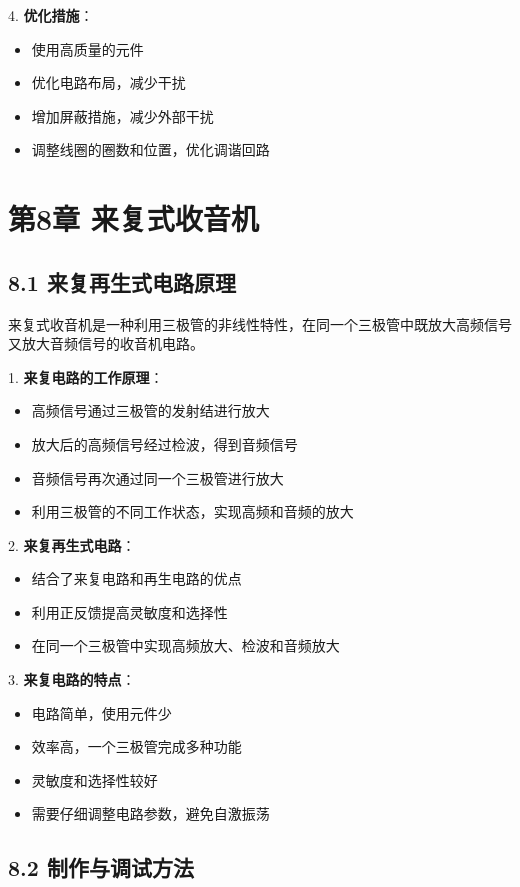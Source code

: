 \documentclass[12pt,UTF8]{ctexbook}
\begin{document}
4. \textbf{优化措施}：
   \begin{itemize}[leftmargin=3.5em]
   \item 使用高质量的元件
   \item 优化电路布局，减少干扰
   \item 增加屏蔽措施，减少外部干扰
   \item 调整线圈的圈数和位置，优化调谐回路
   \end{itemize}

\chapter*{第8章 来复式收音机}
\section*{8.1 来复再生式电路原理}

来复式收音机是一种利用三极管的非线性特性，在同一个三极管中既放大高频信号又放大音频信号的收音机电路。

1. \textbf{来复电路的工作原理}：
   \begin{itemize}[leftmargin=3.5em]
   \item 高频信号通过三极管的发射结进行放大
   \item 放大后的高频信号经过检波，得到音频信号
   \item 音频信号再次通过同一个三极管进行放大
   \item 利用三极管的不同工作状态，实现高频和音频的放大
   \end{itemize}

2. \textbf{来复再生式电路}：
   \begin{itemize}[leftmargin=3.5em]
   \item 结合了来复电路和再生电路的优点
   \item 利用正反馈提高灵敏度和选择性
   \item 在同一个三极管中实现高频放大、检波和音频放大
   \end{itemize}

3. \textbf{来复电路的特点}：
   \begin{itemize}[leftmargin=3.5em]
   \item 电路简单，使用元件少
   \item 效率高，一个三极管完成多种功能
   \item 灵敏度和选择性较好
   \item 需要仔细调整电路参数，避免自激振荡
   \end{itemize}

\section*{8.2 制作与调试方法}
\end{document}
